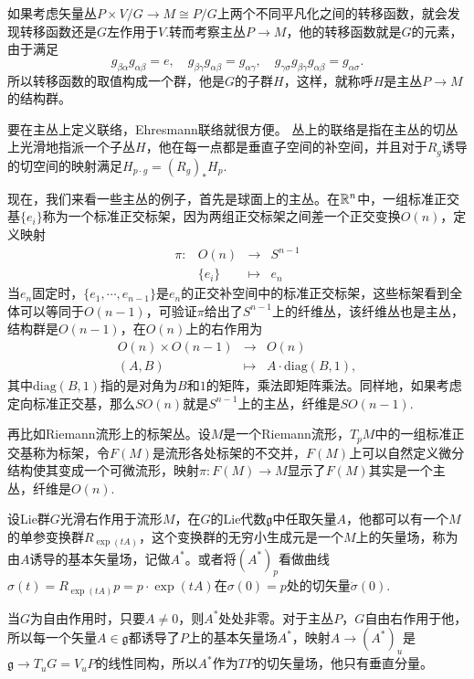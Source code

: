 如果考虑矢量丛$P\times V/G\to M\cong P/G$上两个不同平凡化之间的转移函数，就会发现转移函数还是$G$左作用于$V$.转而考察主丛$P\to M$，他的转移函数就是$G$的元素，由于满足
\begin{equation*}
	g_{\beta\alpha}g_{\alpha\beta}=e,\quad g_{\beta\gamma}g_{\alpha\beta}=g_{\alpha\gamma},\quad g_{\gamma\sigma}g_{\beta\gamma}g_{\alpha\beta}=g_{\alpha\sigma}.
\end{equation*}
所以转移函数的取值构成一个群，他是$G$的子群$H$，这样，就称呼$H$是主丛$P\to M$的结构群。

要在主丛上定义联络，Ehresmann联络就很方便。
\para 丛上的联络是指在主丛的切丛上光滑地指派一个子丛$H$，他在每一点都是垂直子空间的补空间，并且对于$R_g$诱导的切空间的映射满足$H_{p\cdot g}=(R_g)_*H_p$.


现在，我们来看一些主丛的例子，首先是球面上的主丛。在$\mathbb{R}^n$中，一组标准正交基$\{e_i\}$称为一个标准正交标架，因为两组正交标架之间差一个正交变换$O(n)$，定义映射
\[
	\begin{array}{lccl}
		\pi:&O(n)&\to &S^{n-1}\\
		&\{e_i\}&\mapsto&e_n
	\end{array}
\]
当$e_n$固定时，$\{e_1,\cdots,e_{n-1}\}$是$e_n$的正交补空间中的标准正交标架，这些标架看到全体可以等同于$O(n-1)$，可验证$\pi$给出了$S^{n-1}$上的纤维丛，该纤维丛也是主丛，结构群是$O(n-1)$，在$O(n)$上的右作用为
\[
	\begin{array}{lcl}
		O(n)\times O(n-1)&\to& O(n)\\
		(A,B)&\mapsto& A\cdot \mathrm{diag}(B,1),
	\end{array}
\]
其中$\mathrm{diag}(B,1)$指的是对角为$B$和$1$的矩阵，乘法即矩阵乘法。同样地，如果考虑定向标准正交基，那么$SO(n)$就是$S^{n-1}$上的主丛，纤维是$SO(n-1)$.

再比如Riemann流形上的标架丛。设$M$是一个Riemann流形，$T_pM$中的一组标准正交基称为标架，令$F(M)$是流形各处标架的不交并，$F(M)$上可以自然定义微分结构使其变成一个可微流形，映射$\pi :F(M)\to M$显示了$F(M)$其实是一个主丛，纤维是$O(n)$.

\para 设Lie群$G$光滑右作用于流形$M$，在$G$的Lie代数$\mathfrak{g}$中任取矢量$A$，他都可以有一个$M$的单参变换群$R_{\exp(tA)}$，这个变换群的无穷小生成元是一个$M$上的矢量场，称为由$A$诱导的基本矢量场，记做$A^*$。或者将$(A^*)_p$看做曲线$\sigma(t)=R_{\exp(tA)}p=p\cdot\exp(tA)$在$\sigma(0)=p$处的切矢量$\dot\sigma(0)$.

当$G$为自由作用时，只要$A\neq 0$，则$A^*$处处非零。对于主丛$P$，$G$自由右作用于他，所以每一个矢量$A\in \mathfrak{g}$都诱导了$P$上的基本矢量场$A^*$，映射$A\to (A^*)_u$是$\mathfrak{g}\to T_uG=V_uP$的线性同构，所以$A^*$作为$TP$的切矢量场，他只有垂直分量。

